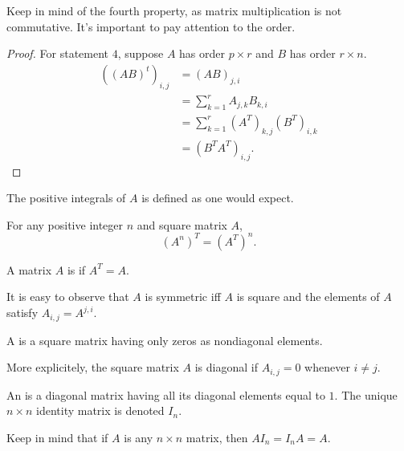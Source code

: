 Keep in mind of the fourth property, as matrix multiplication is not commutative. 
It's important to pay attention to the order.

\begin{proof}
  For statement $4$, suppose $A$ has order $p \times r$ and $B$ has order $r \times n$.
  \begin{align*}
    \left( \left(AB\right)^{t}\right)_{i, j} &= \left(AB\right)_{j, i} \\ 
                                             &= \sum^{r}_{k = 1} A_{j, k} B_{k, i} \\ 
                                             &= \sum^{r}_{k = 1} \left(A^{T}\right)_{k, j} \left(B^{T}\right)_{i, k} \\ 
                                             &= \left(B^{T}A^{T}\right)_{i, j}.
  \end{align*}
\end{proof}

The positive integrals of $A$ is defined as one would expect.

\begin{corollary}
  For any positive integer $n$ and square matrix $A$, 
  \begin{equation*}
    \left(A^{n}\right)^{T} = \left(A^{T}\right)^{n}.
  \end{equation*}
\end{corollary}

\begin{definition}
  A matrix $A$ is  if $A^{T} = A$. 

  It is easy to observe that $A$ is symmetric iff $A$ is square and the elements of $A$ satisfy $A_{i, j} = A^{j, i}$.
\end{definition}

\begin{definition}
  A  is a square matrix having only zeros as nondiagonal elements.

  More explicitely, the square matrix $A$ is diagonal if $A_{i, j} = 0$ whenever $i \neq j$.
\end{definition}

\begin{definition}
  An  is a diagonal matrix having all its diagonal elements equal to $1$. 
  The unique $n \times n$ identity matrix is denoted $I_{n}$.
\end{definition}

Keep in mind that if $A$ is any $n \times n$ matrix, then $AI_{n} = I_{n}A = A$.

